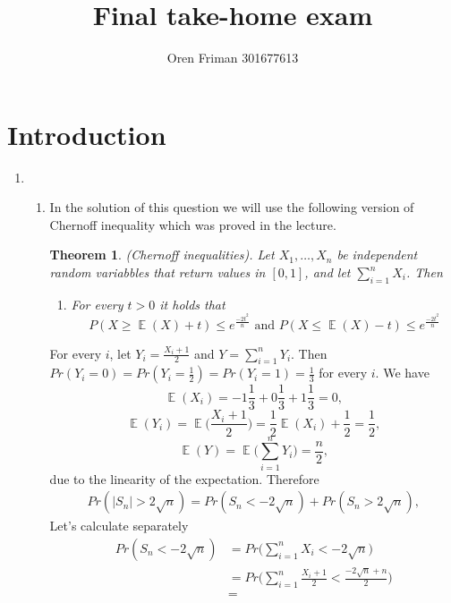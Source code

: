 \documentclass[a4paper, 11pt, oneside]{article}
\newtheorem{theorem}{Theorem}[section]
\newcommand\abs[1]{\left|#1\right|}
\DeclareMathOperator{\EX}{\mathbb{E}}
\begin{document}
\title{Final take-home exam}
\author{Oren Friman 301677613}
\maketitle
				   
\section{Introduction}
\begin{enumerate}
\item
 \begin{enumerate}
\item  In the solution of this question we will use the following version of Chernoff inequality which was proved in the lecture.
\begin{theorem} (Chernoff inequalities). Let $X_1,\ldots,X_n$ be independent random variabbles that return values in $[0,1]$, and let $\sum_{i=1}^nX_i$. Then
 \begin{enumerate}
 \item For every $t>0$ it holds that
 \begin{equation*}
P(X\geq\EX(X)+t) \leq e^{\frac{-2t^2}{n}}\text{ and } P(X\leq\EX(X)-t) \leq e^{\frac{-2t^2}{n}}
\end{equation*}
 \end{enumerate}
\end{theorem}
For every $i$, let $Y_i = \frac{X_i+1}{2}$ and $Y = \sum_{i=1}^nY_i$. Then $Pr(Y_i=0) = Pr(Y_i=\frac{1}{2}) = Pr(Y_i=1) = \frac{1}{3}$ for every $i$. We have
  \begin{equation}\label{ex}
 \EX(X_i) = -1 \frac{1}{3} + 0 \frac{1}{3} + 1 \frac{1}{3} = 0,
 \end{equation}
\begin{equation*}
 \EX(Y_i) = \EX\bigg(\frac{X_i + 1}{2}\bigg) = \frac{1}{2}\EX(X_i)+\frac{1}{2} = \frac{1}{2},
 \end{equation*}
  \begin{equation*}
 \EX(Y) = \EX\bigg(\sum^n_{i=1}Y_i\bigg) = \frac{n}{2},
 \end{equation*}
due to the linearity of the expectation. Therefore
\begin{align*}
Pr(\abs{S_n}>2\sqrt{n}) = Pr(S_n<-2\sqrt{n}) + Pr(S_n>2\sqrt{n}),
\end{align*}
Let's calculate separately
\begin{align*}
 Pr(S_n<-2\sqrt{n}) &=
 Pr\bigg(\sum_{i=1}^nX_i<-2\sqrt{n}\bigg) \\&=
 Pr\bigg(\sum_{i=1}^n\frac{X_i+1}{2}<\frac{-2\sqrt{n}+n}{2}\bigg)\\&=

\end{align*}
\end{enumerate}
\end{enumerate}
\end{document}
